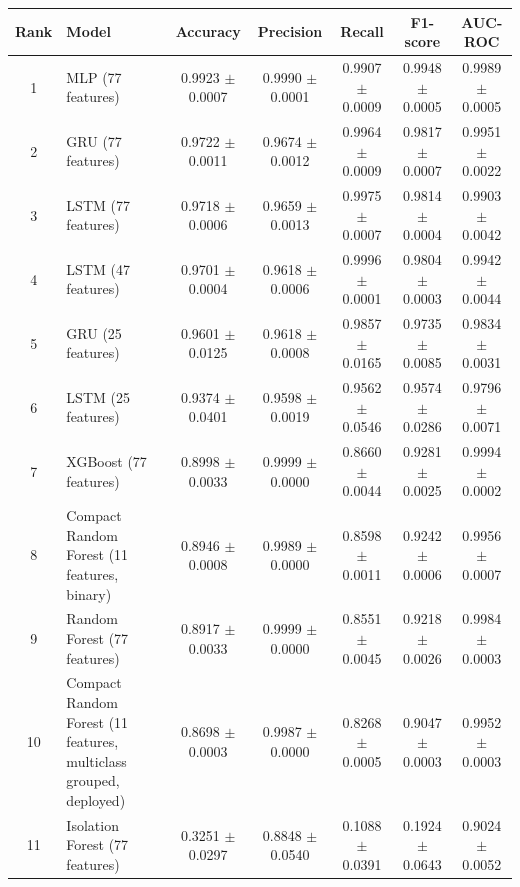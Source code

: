 \begin{tabular}{clccccc}
\toprule
\textbf{Rank} & \textbf{Model} & \textbf{Accuracy} & \textbf{Precision} & \textbf{Recall} & \textbf{F1-score} & \textbf{AUC-ROC}\\
\midrule
1 & MLP (77 features) & 0.9923 $\pm$ 0.0007 & 0.9990 $\pm$ 0.0001 & 0.9907 $\pm$ 0.0009 & 0.9948 $\pm$ 0.0005 & 0.9989 $\pm$ 0.0005\\
2 & GRU (77 features) & 0.9722 $\pm$ 0.0011 & 0.9674 $\pm$ 0.0012 & 0.9964 $\pm$ 0.0009 & 0.9817 $\pm$ 0.0007 & 0.9951 $\pm$ 0.0022\\
3 & LSTM (77 features) & 0.9718 $\pm$ 0.0006 & 0.9659 $\pm$ 0.0013 & 0.9975 $\pm$ 0.0007 & 0.9814 $\pm$ 0.0004 & 0.9903 $\pm$ 0.0042\\
4 & LSTM (47 features) & 0.9701 $\pm$ 0.0004 & 0.9618 $\pm$ 0.0006 & 0.9996 $\pm$ 0.0001 & 0.9804 $\pm$ 0.0003 & 0.9942 $\pm$ 0.0044\\
5 & GRU (25 features) & 0.9601 $\pm$ 0.0125 & 0.9618 $\pm$ 0.0008 & 0.9857 $\pm$ 0.0165 & 0.9735 $\pm$ 0.0085 & 0.9834 $\pm$ 0.0031\\
6 & LSTM (25 features) & 0.9374 $\pm$ 0.0401 & 0.9598 $\pm$ 0.0019 & 0.9562 $\pm$ 0.0546 & 0.9574 $\pm$ 0.0286 & 0.9796 $\pm$ 0.0071\\
7 & XGBoost (77 features) & 0.8998 $\pm$ 0.0033 & 0.9999 $\pm$ 0.0000 & 0.8660 $\pm$ 0.0044 & 0.9281 $\pm$ 0.0025 & 0.9994 $\pm$ 0.0002\\
8 & Compact Random Forest (11 features, binary) & 0.8946 $\pm$ 0.0008 & 0.9989 $\pm$ 0.0000 & 0.8598 $\pm$ 0.0011 & 0.9242 $\pm$ 0.0006 & 0.9956 $\pm$ 0.0007\\
9 & Random Forest (77 features) & 0.8917 $\pm$ 0.0033 & 0.9999 $\pm$ 0.0000 & 0.8551 $\pm$ 0.0045 & 0.9218 $\pm$ 0.0026 & 0.9984 $\pm$ 0.0003\\
10 & Compact Random Forest (11 features, multiclass grouped, deployed) & 0.8698 $\pm$ 0.0003 & 0.9987 $\pm$ 0.0000 & 0.8268 $\pm$ 0.0005 & 0.9047 $\pm$ 0.0003 & 0.9952 $\pm$ 0.0003\\
11 & Isolation Forest (77 features) & 0.3251 $\pm$ 0.0297 & 0.8848 $\pm$ 0.0540 & 0.1088 $\pm$ 0.0391 & 0.1924 $\pm$ 0.0643 & 0.9024 $\pm$ 0.0052\\
\bottomrule
\end{tabular}
